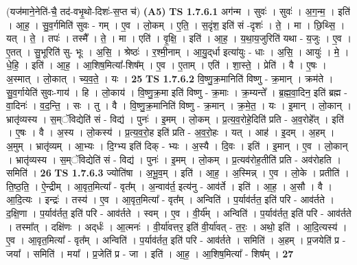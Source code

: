 \documentclass[17pt]{extarticle}
\begin{document}
                  \newline
                      (यज॑माने॒नेति॑-चै॒ तद॑-वभृ॒थो-दिशः॑-स॒प्त च॑)  \textbf{(A5)} \newline \newline
                                \textbf{ TS 1.7.6.1} \newline
                  अग॑न्म । सुवः॑ । सुवः॑ । अ॒ग॒न्म॒ । इति॑ । आ॒ह॒ । सु॒व॒र्गमिति॑ सुवः - गम् । ए॒व । लो॒कम् । ए॒ति॒ । स॒दृंश॒ इति॑ सं -दृशः॑ । ते॒ । मा । छि॒थ्सि॒ । यत् । ते॒ । तपः॑ । तस्मै᳚ । ते॒ । मा । एति॑ । वृ॒क्षि॒ । इति॑ । आ॒ह॒ । य॒था॒य॒जुरिति॑ यथा - य॒जुः । ए॒व । ए॒तत् । सु॒भूरिति॑ सु- भूः । अ॒सि॒ । श्रेष्ठः॑ । र॒श्मी॒नाम् । आ॒यु॒द्‌र्धा इत्या॑युः - धाः । अ॒सि॒ । आयुः॑ । मे॒ । धे॒हि॒ । इति॑ । आ॒ह॒ । आ॒शिष॒मित्या᳚-शिष᳚म् । ए॒व । ए॒ताम् । एति॑ । शा॒स्ते॒ । प्रेति॑ । वै । ए॒षः । अ॒स्मात् । लो॒कात् । च्य॒व॒ते॒ । यः । \textbf{  25} \newline
                  \newline
                                \textbf{ TS 1.7.6.2} \newline
                  वि॒ष्णु॒क्र॒मानिति॑ विष्णु - क्र॒मान् । क्रम॑ते । सु॒व॒र्गायेति॑ सुवः-गाय॑ । हि । लो॒काय॑ । वि॒ष्णु॒क्र॒मा इति॑ विष्णु - क्र॒माः । क्र॒म्यन्ते᳚ । ब्र॒ह्म॒वा॒दिन॒ इति॑ ब्रह्म - वा॒दिनः॑ । व॒द॒न्ति॒ । सः । तु । वै । वि॒ष्णु॒क्र॒मानिति॑ विष्णु - क्र॒मान् । क्र॒मे॒त॒ । यः । इ॒मान् । लो॒कान् । भ्रातृ॑व्यस्य । स॒म्ॅविद्येति॑ सं - विद्य॑ । पुनः॑ । इ॒मम् । लो॒कम् । प्र॒त्य॒व॒रोहे॒दिति॑ प्रति - अ॒व॒रोहे᳚त् । इति॑ । ए॒षः । वै । अ॒स्य । लो॒कस्य॑ । प्र॒त्य॒व॒रो॒ह इति॑ प्रति - अ॒व॒रो॒हः । यत् । आह॑ । इ॒दम् । अ॒हम् । अ॒मुम् । भ्रातृ॑व्यम् । आ॒भ्यः । दि॒ग्भ्य इति॑ दिक् - भ्यः । अ॒स्यै । दि॒वः । इति॑ । इ॒मान् । ए॒व । लो॒कान् । भ्रातृ॑व्यस्य । स॒म्ॅविद्येति॑ सं - विद्य॑ । पुनः॑ । इ॒मम् । लो॒कम् । प्र॒त्यव॑रोह॒तीति॑ प्रति - अव॑रोहति । समिति॑ । \textbf{  26} \newline
                  \newline
                                \textbf{ TS 1.7.6.3} \newline
                  ज्योति॑षा । अ॒भू॒व॒म् । इति॑ । आ॒ह॒ । अ॒स्मिन्न् । ए॒व । लो॒के । प्रतीति॑ । ति॒ष्ठ॒ति॒ । ऐ॒न्द्रीम् । आ॒वृत॒मित्या᳚ - वृत᳚म् । अ॒न्वाव॑र्त॒ इत्य॑नु - आव॑र्ते । इति॑ । आ॒ह॒ । अ॒सौ । वै । आ॒दि॒त्यः । इन्द्रः॑ । तस्य॑ । ए॒व । आ॒वृत॒मित्या᳚ - वृत᳚म् । अन्विति॑ । प॒र्याव॑र्तत॒ इति॑ परि - आव॑र्तते । द॒क्षि॒णा । प॒र्याव॑र्तत॒ इति॑ परि - आव॑र्तते । स्वम् । ए॒व । वी॒र्य᳚म् । अन्विति॑ । प॒र्याव॑र्तत॒ इति॑ परि - आव॑र्तते । तस्मा᳚त् । दक्षि॑णः । अद्‌र्धः॑ । आ॒त्मनः॑ । वी॒र्या॑वत्तर॒ इति॑ वी॒र्या॑वत् - त॒रः॒ । अथो॒ इति॑ । आ॒दि॒त्यस्य॑ । ए॒व । आ॒वृत॒मित्या᳚ - वृत᳚म् । अन्विति॑ । प॒र्याव॑र्तत॒ इति॑ परि - आव॑र्तते । समिति॑ । अ॒हम् । प्र॒जयेति॑ प्र - जया᳚ । समिति॑ । मया᳚ । प्र॒जेति॑ प्र - जा । इति॑ । आ॒ह॒ । आ॒शिष॒मित्या᳚ - शिष᳚म् । \textbf{  27} \newline
\end{document}
